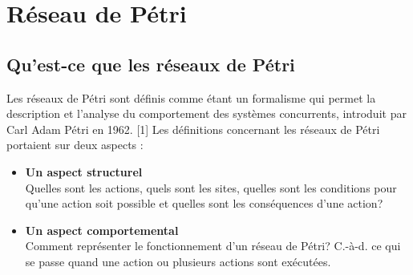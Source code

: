 %
%


\section{Réseau de Pétri}

\subsection{Qu'est-ce que les réseaux de Pétri }
Les réseaux de Pétri sont définis comme étant un formalisme qui permet la description et l'analyse du comportement des systèmes concurrents, introduit par Carl Adam Pétri en 1962. [1]  Les définitions concernant les réseaux de Pétri portaient sur deux aspects :


\begin{itemize}
	\item \textbf{	Un aspect structurel }
\\
	Quelles sont les actions, quels sont les sites, quelles sont les conditions pour qu'une action soit possible et quelles sont les conséquences d'une action?
	
	\item \textbf{ Un aspect comportemental}
	\\
	Comment représenter le fonctionnement d'un réseau de Pétri? C.-à-d. ce qui se passe quand une action ou plusieurs actions sont exécutées.
\end{itemize}

